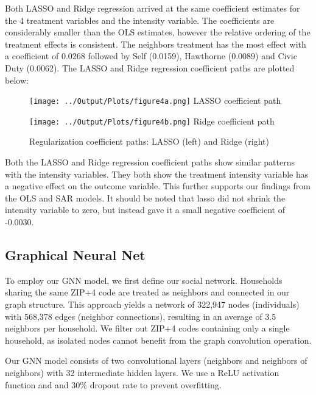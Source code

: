 \documentclass[11pt]{article}
\begin{document}
Both LASSO and Ridge regression arrived at the same coefficient estimates for the 4 treatment variables and the intensity variable. The coefficients are considerably smaller than the OLS estimates, however the relative ordering of the treatment effects is consistent. The neighbors treatment has the most effect with a coefficient of 0.0268 followed by Self (0.0159), Hawthorne (0.0089) and Civic Duty (0.0062). The LASSO and Ridge regression coefficient paths are plotted below:
\begin{figure}[H]
    \centering
    \begin{minipage}[t]{0.48\textwidth}
        \centering
        \texttt{[image: ../Output/Plots/figure4a.png]}
        \vspace{0.3em}
        {\small LASSO coefficient path}
    \end{minipage}
    \hfill
    \begin{minipage}[t]{0.48\textwidth}
        \centering
        \texttt{[image: ../Output/Plots/figure4b.png]}
        \vspace{0.3em}
        {\small Ridge coefficient path}
    \end{minipage}
    \caption{Regularization coefficient paths: LASSO (left) and Ridge (right)}
    \label{fig:coef_paths}
\end{figure}

Both the LASSO and Ridge regression coefficient paths show similar patterns with the intensity variables. They both show the treatment intensity variable has a negative effect on the outcome variable. This further supports our findings from the OLS and SAR models. It should be noted that lasso did not shrink the intensity variable to zero, but instead gave it a small negative coefficient of -0.0030.

\subsection{Graphical Neural Net}
To employ our GNN model, we first define our social network. Households sharing the same ZIP+4 code are treated as neighbors and connected in our graph structure. This approach yields a network of 322,947 nodes (individuals) with 568,378 edges (neighbor connections), resulting in an average of 3.5 neighbors per household. We filter out ZIP+4 codes containing only a single household, as isolated nodes cannot benefit from the graph convolution operation.

Our GNN model consists of two convolutional layers (neighbors and neighbors of neighbors) with 32 intermediate hidden layers. We use a ReLU activation function and and 30\% dropout rate to prevent overfitting. 
\end{document}
